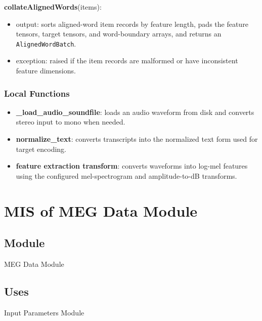 \documentclass[12pt, titlepage]{article}
\begin{document}
\noindent \textbf{collateAlignedWords}(items):
\begin{itemize}
    \item output: sorts aligned-word item records by feature length, pads the feature tensors, target tensors, and word-boundary arrays, and returns an \texttt{AlignedWordBatch}.
    \item exception: raised if the item records are malformed or have inconsistent feature dimensions.
\end{itemize}

\subsubsection{Local Functions}

\begin{itemize}
    \item \textbf{\_load\_audio\_soundfile}: loads an audio waveform from disk and converts stereo input to mono when needed.

    \item \textbf{normalize\_text}: converts transcripts into the normalized text form used for target encoding.

    \item \textbf{feature extraction transform}: converts waveforms into log-mel features using the configured mel-spectrogram and amplitude-to-dB transforms.
\end{itemize}












\newpage


\section{MIS of MEG Data Module} \label{Module_MEGData}

\subsection{Module}

MEG Data Module

\subsection{Uses}

Input Parameters Module
\end{document}
